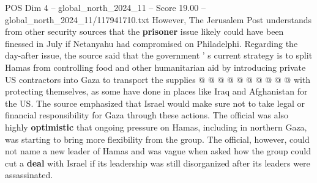 \begin{textsample}{POS Dim 4 – global\_north\_2024\_11 – Score 19.00 – global\_north\_2024\_11/117941710.txt}
However, The Jerusalem Post understands from other security sources that the \textbf{prisoner} issue likely could have been finessed in July if Netanyahu had compromised on Philadelphi.
Regarding the day-after issue, the source said that the government ' s current strategy is to split Hamas from controlling food and other humanitarian aid by introducing private US contractors into Gaza to transport the supplies @ @ @ @ @ @ @ @ @ @ with protecting themselves, as some have done in places like Iraq and Afghanistan for the US.
The source emphasized that Israel would make sure not to take legal or financial responsibility for Gaza through these actions.
The official was also highly \textbf{optimistic} that ongoing pressure on Hamas, including in northern Gaza, was starting to bring more flexibility from the group.
The official, however, could not name a new leader of Hamas and was vague when asked how the group could cut a \textbf{deal} with Israel if its leadership was still disorganized after its leaders were assassinated.

\end{textsample}
